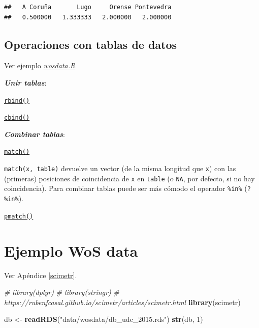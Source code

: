 \documentclass[]{book}
\newenvironment{Shaded}{\begin{snugshade}}{\end{snugshade}}
\newcommand{\CommentTok}[1]{\textcolor[rgb]{0.56,0.35,0.01}{\textit{#1}}}
\newcommand{\DecValTok}[1]{\textcolor[rgb]{0.00,0.00,0.81}{#1}}
\newcommand{\KeywordTok}[1]{\textcolor[rgb]{0.13,0.29,0.53}{\textbf{#1}}}
\newcommand{\NormalTok}[1]{#1}
\newcommand{\StringTok}[1]{\textcolor[rgb]{0.31,0.60,0.02}{#1}}
\begin{document}
\begin{verbatim}
##   A Coruña       Lugo     Orense Pontevedra 
##   0.500000   1.333333   2.000000   2.000000
\end{verbatim}

\hypertarget{operaciones-con-tablas-de-datos}{%
\subsection{Operaciones con tablas de datos}\label{operaciones-con-tablas-de-datos}}

Ver ejemplo \href{data/wosdata.zip}{\emph{wosdata.R}}

\textbf{\emph{Unir tablas}}:

\href{https://www.rdocumentation.org/packages/base/versions/3.6.1/topics/rbind}{\texttt{rbind()}}

\href{https://www.rdocumentation.org/packages/base/versions/3.6.1/topics/cbind}{\texttt{cbind()}}

\textbf{\emph{Combinar tablas}}:

\href{https://www.rdocumentation.org/packages/base/versions/3.6.1/topics/match}{\texttt{match()}}

\texttt{match(x,\ table)} devuelve un vector (de la misma longitud que \texttt{x})
con las (primeras) posiciones de coincidencia de \texttt{x} en \texttt{table}
(o \texttt{NA}, por defecto, si no hay coincidencia).
Para combinar tablas puede ser más cómodo el operador \texttt{\%in\%} (\texttt{?\textquotesingle{}\%in\%\textquotesingle{}}).

\href{https://www.rdocumentation.org/packages/base/versions/3.6.1/topics/match}{\texttt{pmatch()}}

\hypertarget{ejemplo-wos-data}{%
\section{Ejemplo WoS data}\label{ejemplo-wos-data}}

Ver Apéndice \ref{scimetr}.

\begin{Shaded}
\begin{Highlighting}[]
\CommentTok{# library(dplyr)}
\CommentTok{# library(stringr)}
\CommentTok{# https://rubenfcasal.github.io/scimetr/articles/scimetr.html}
\KeywordTok{library}\NormalTok{(scimetr)}

\NormalTok{db <-}\StringTok{ }\KeywordTok{readRDS}\NormalTok{(}\StringTok{"data/wosdata/db_udc_2015.rds"}\NormalTok{)}
\KeywordTok{str}\NormalTok{(db, }\DecValTok{1}\NormalTok{)}
\end{Highlighting}
\end{Shaded}
\end{document}
